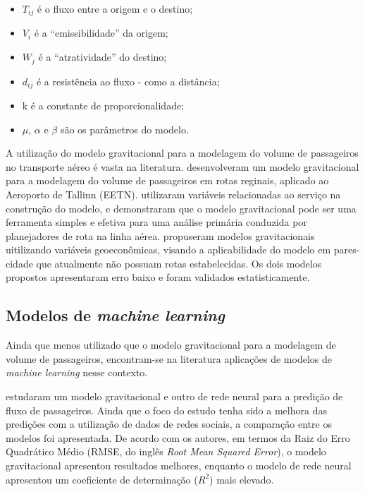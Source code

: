 \documentclass[12pt]{article}
\providecommand{\tightlist}{%
  \setlength{\itemsep}{0pt}\setlength{\parskip}{0pt}}
\begin{document}
\begin{itemize}
\tightlist
\item
  \(T_{ij}\) é o fluxo entre a origem e o destino;
\item
  \(V_i\) é a \enquote{emissibilidade} da origem;
\item
  \(W_j\) é a \enquote{atratividade} do destino;
\item
  \(d_{ij}\) é a resistência ao fluxo - como a distância;
\item
  k é a constante de proporcionalidade;
\item
  \(\mu\), \(\alpha\) e \(\beta\) são os parâmetros do modelo.
\end{itemize}

A utilização do modelo gravitacional para a modelagem do volume de
passageiros no transporte aéreo é vasta na literatura.
\citet{Nommik2016} desenvolveram um modelo gravitacional para a
modelagem do volume de passageiros em rotas reginais, aplicado ao
Aeroporto de Tallinn (EETN). \citet{Nommik2016} utilizaram variáveis
relacionadas ao serviço na construção do modelo, e demonstraram que o
modelo gravitacional pode ser uma ferramenta simples e efetiva para uma
análise primária conduzida por planejadores de rota na linha aérea.
\citet{Grosche2007} propuseram modelos gravitacionais uitilizando
variáveis geoeconômicas, visando a aplicabilidade do modelo em
pares-cidade que atualmente não possuam rotas estabelecidas. Os dois
modelos propostos apresentaram erro baixo e foram validados
estatisticamente.

\hypertarget{modelos-de-machine-learning}{%
\subsection{\texorpdfstring{Modelos de \emph{machine
learning}}{Modelos de machine learning}}\label{modelos-de-machine-learning}}

Ainda que menos utilizado que o modelo gravitacional para a modelagem de
volume de passageiros, encontram-se na literatura aplicações de modelos
de \emph{machine learning} nesse contexto.

\citet{pourebrahim2018} estudaram um modelo gravitacional e outro de
rede neural para a predição de fluxo de passageiros. Ainda que o foco do
estudo tenha sido a melhora das predições com a utilização de dados de
redes sociais, a comparação entre os modelos foi apresentada. De acordo
com os autores, em termos da Raiz do Erro Quadrático Médio (RMSE, do
inglês \emph{Root Mean Squared Error}), o modelo gravitacional
apresentou resultados melhores, enquanto o modelo de rede neural
apresentou um coeficiente de determinação (\(R^2\)) mais elevado.
\end{document}
